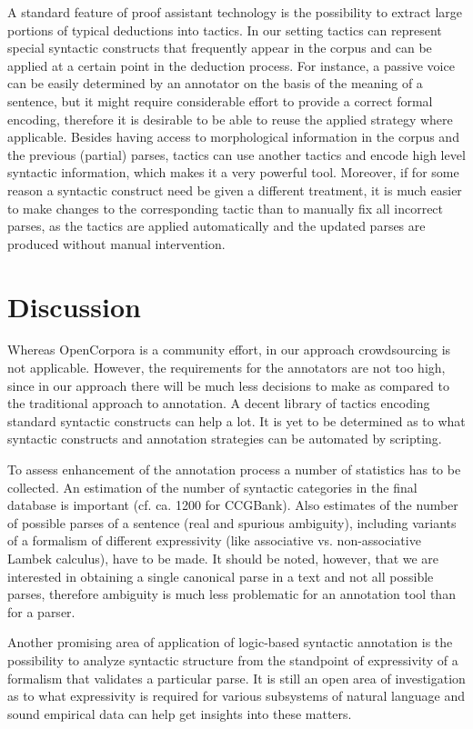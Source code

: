 \documentclass[a4paper]{article}
\theoremstyle{example-style}
\begin{document}
A standard feature of proof assistant technology is the possibility to extract large portions of typical deductions into tactics. In our setting tactics can represent special syntactic constructs that frequently appear in the corpus and can be applied at a certain point in the deduction process. For instance, a passive voice can be easily determined by an annotator on the basis of the meaning of a sentence, but it might require considerable effort to provide a correct formal encoding, therefore it is desirable to be able to reuse the applied strategy where applicable. Besides having access to morphological information in the corpus and the previous (partial) parses, tactics can use another tactics and encode high level syntactic information, which makes it a very powerful tool. Moreover, if for some reason a syntactic construct need be given a different treatment, it is much easier to make changes to the corresponding tactic than to manually fix all incorrect parses, as the tactics are applied automatically and the updated parses are produced without manual intervention.
  

\section{Discussion}

Whereas OpenCorpora is a community effort, in our approach crowdsourcing is not applicable. However, the requirements for the annotators are not too high, since in our approach there will be much less decisions to make as compared to the traditional approach to annotation. A decent library of tactics encoding standard syntactic constructs can help a lot. It is yet to be determined as to what syntactic constructs and annotation strategies can be automated by scripting.

To assess enhancement of the annotation process a number of statistics has to be collected. An estimation of the number of syntactic categories in the final database is important (cf. ca. 1200 for CCGBank). Also estimates of the number of possible parses of a sentence (real and spurious ambiguity), including variants of a formalism of different expressivity (like associative vs. non-associative Lambek calculus), have to be made. It should be noted, however, that we are interested in obtaining a single canonical parse in a text and not all possible parses, therefore ambiguity is much less problematic for an annotation tool than for a parser.
  
Another promising area of application of logic-based syntactic annotation is the possibility to analyze syntactic structure from the standpoint of expressivity of a formalism that validates a particular parse. It is still an open area of investigation as to what expressivity is required for various subsystems of natural language and sound empirical data can help get insights into these matters.



\printbibliography[resetnumbers=true]
\end{document}
